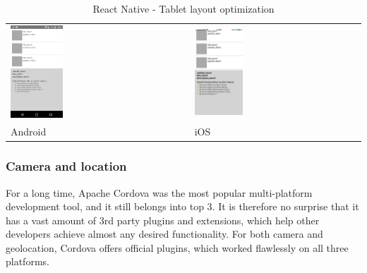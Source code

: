 \documentclass[english,master,public,dept460,male,cpdeclaration,oneside]{diploma}
\begin{document}
\begin{table}[!h]
	\centering
	\caption{React Native - Tablet layout optimization}
	\label{table:react6}
	\begin{tabular}{p{5cm} | p{5cm}  }
		\toprule		
		\includegraphics[width=0.3\textwidth]{Figures/react6android.PNG}
		& \includegraphics[width=0.3\textwidth]{Figures/react6ios.jpg}
		\\
		Android & iOS \\
		\midrule
	\end{tabular}
\end{table}

\subsubsection{Camera and location}
For a long time, Apache Cordova was the most popular multi-platform development tool, and it still belongs into top 3. It is therefore no surprise that it has a vast amount of 3rd party plugins and extensions, which help other developers achieve almost any desired functionality. For both camera and geolocation, Cordova offers official plugins, which worked flawlessly on all three platforms.
\end{document}
